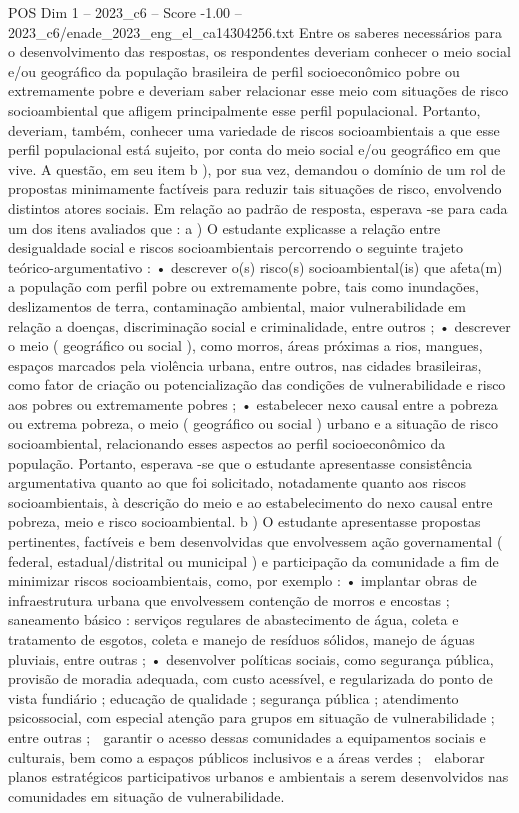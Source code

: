 \begin{textsample}{POS Dim 1 – 2023\_c6 – Score -1.00 – 2023\_c6/enade\_2023\_eng\_el\_ca14304256.txt}
Entre os saberes necessários para o desenvolvimento das respostas, os respondentes deveriam conhecer o meio social e/ou geográfico da população brasileira de perfil socioeconômico pobre ou extremamente pobre e deveriam saber relacionar esse meio com situações de risco socioambiental que afligem principalmente esse perfil populacional.
Portanto, deveriam, também, conhecer uma variedade de riscos socioambientais a que esse perfil populacional está sujeito, por conta do meio social e/ou geográfico em que vive.
A questão, em seu item b ), por sua vez, demandou o domínio de um rol de propostas minimamente factíveis para reduzir tais situações de risco, envolvendo distintos atores sociais.
Em relação ao padrão de resposta, esperava -se para cada um dos itens avaliados que : a ) O estudante explicasse a relação entre desigualdade social e riscos socioambientais percorrendo o seguinte trajeto teórico-argumentativo : • descrever o(s) risco(s) socioambiental(is) que afeta(m) a população com perfil pobre ou extremamente pobre, tais como inundações, deslizamentos de terra, contaminação ambiental, maior vulnerabilidade em relação a doenças, discriminação social e criminalidade, entre outros ; • descrever o meio ( geográfico ou social ), como morros, áreas próximas a rios, mangues, espaços marcados pela violência urbana, entre outros, nas cidades brasileiras, como fator de criação ou potencialização das condições de vulnerabilidade e risco aos pobres ou extremamente pobres ; • estabelecer nexo causal entre a pobreza ou extrema pobreza, o meio ( geográfico ou social ) urbano e a situação de risco socioambiental, relacionando esses aspectos ao perfil socioeconômico da população.
Portanto, esperava -se que o estudante apresentasse consistência argumentativa quanto ao que foi solicitado, notadamente quanto aos riscos socioambientais, à descrição do meio e ao estabelecimento do nexo causal entre pobreza, meio e risco socioambiental. b ) O estudante apresentasse propostas pertinentes, factíveis e bem desenvolvidas que envolvessem ação governamental ( federal, estadual/distrital ou municipal ) e participação da comunidade a fim de minimizar riscos socioambientais, como, por exemplo : • implantar obras de infraestrutura urbana que envolvessem contenção de morros e encostas ; saneamento básico : serviços regulares de abastecimento de água, coleta e tratamento de esgotos, coleta e manejo de resíduos sólidos, manejo de águas pluviais, entre outras ; • desenvolver políticas sociais, como segurança pública, provisão de moradia adequada, com custo acessível, e regularizada do ponto de vista fundiário ; educação de qualidade ; segurança pública ; atendimento psicossocial, com especial atenção para grupos em situação de vulnerabilidade ; entre outras ;  garantir o acesso dessas comunidades a equipamentos sociais e culturais, bem como a espaços públicos inclusivos e a áreas verdes ;  elaborar planos estratégicos participativos urbanos e ambientais a serem desenvolvidos nas comunidades em situação de vulnerabilidade.

\end{textsample}
